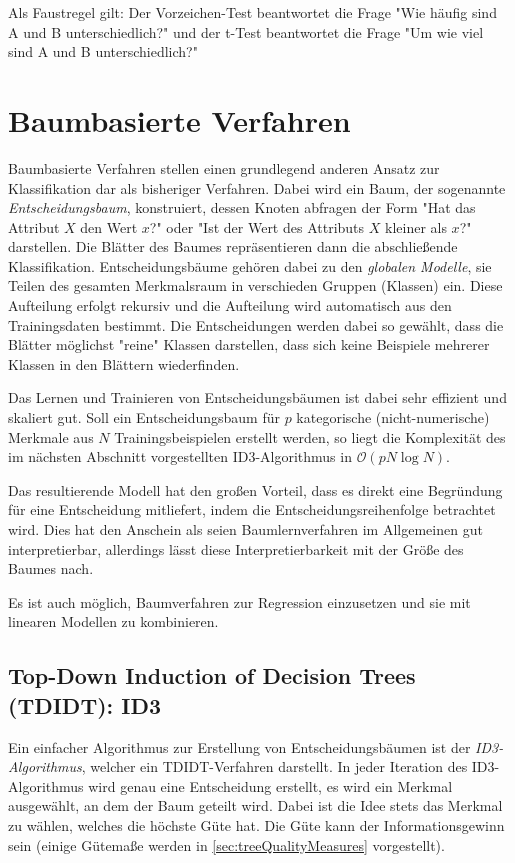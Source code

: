 		Als Faustregel gilt: Der Vorzeichen-Test beantwortet die Frage "Wie häufig sind A und B unterschiedlich?" und der t-Test beantwortet die Frage "Um wie viel sind A und B unterschiedlich?"

\chapter{Baumbasierte Verfahren}
	\label{c:trees}

	Baumbasierte Verfahren stellen einen grundlegend anderen Ansatz zur Klassifikation dar als bisheriger Verfahren. Dabei wird ein Baum, der sogenannte \emph{Entscheidungsbaum}, konstruiert, dessen Knoten abfragen der Form "Hat das Attribut \(X\) den Wert \(x\)?" oder "Ist der Wert des Attributs \(X\) kleiner als \(x\)?" darstellen. Die Blätter des Baumes repräsentieren dann die abschließende Klassifikation. Entscheidungsbäume gehören dabei zu den \emph{globalen Modelle}, \dh sie Teilen des gesamten Merkmalsraum in verschieden Gruppen (Klassen) ein. Diese Aufteilung erfolgt rekursiv und die Aufteilung wird automatisch aus den Trainingsdaten bestimmt. Die Entscheidungen werden dabei so gewählt, dass die Blätter möglichst "reine" Klassen darstellen, \dh dass sich keine Beispiele mehrerer Klassen in den Blättern wiederfinden.

	Das Lernen und Trainieren von Entscheidungsbäumen ist dabei sehr effizient und skaliert gut. Soll ein Entscheidungsbaum für \(p\) kategorische (nicht-numerische) Merkmale aus \(N\) Trainingsbeispielen erstellt werden, so liegt die Komplexität des im nächsten Abschnitt vorgestellten ID3-Algorithmus in \( \mathcal{O}(p N \log N) \).

	Das resultierende Modell hat den großen Vorteil, dass es direkt eine Begründung für eine Entscheidung mitliefert, indem die Entscheidungsreihenfolge betrachtet wird. Dies hat den Anschein als seien Baumlernverfahren im Allgemeinen gut interpretierbar, allerdings lässt diese Interpretierbarkeit mit der Größe des Baumes nach.

	Es ist auch möglich, Baumverfahren zur Regression einzusetzen und sie \bspw mit linearen Modellen zu kombinieren.

	\section{Top-Down Induction of Decision Trees (TDIDT): ID3}
		Ein einfacher Algorithmus zur Erstellung von Entscheidungsbäumen ist der \emph{ID3-Algorithmus}, welcher ein TDIDT-Verfahren darstellt. In jeder Iteration des ID3-Algorithmus wird genau eine Entscheidung erstellt, \dh es wird ein Merkmal ausgewählt, an dem der Baum geteilt wird. Dabei ist die Idee stets das Merkmal zu wählen, welches die höchste Güte hat. Die Güte kann \bspw der Informationsgewinn sein (einige Gütemaße werden in \autoref{sec:treeQualityMeasures} vorgestellt).

